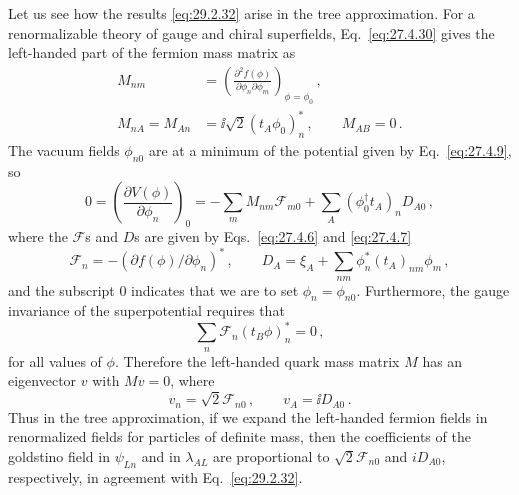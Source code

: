 Let us see how the results \eqref{eq:29.2.32} arise in the tree
approximation. For a renormalizable theory of gauge and chiral
superfields, Eq.~\eqref{eq:27.4.30} gives the left-handed part of the
fermion mass matrix as
\begin{equation}
  \begin{aligned}
  M_{nm}
  &=
  \left(
    \frac{\partial^2f(\phi)}
         {\partial\phi_n\partial\phi_m}
  \right)_{\phi=\phi_0}\,,
  \\
  M_{nA}=M_{An}
  &=\ii\sqrt{2}(t_A\phi_0)_n^*\,,
  \qquad
  M_{AB}=0\,.
  \end{aligned}
  \tag{29.2.33}\label{eq:29.2.33}
\end{equation}
The vacuum fields \(\phi_{n0}\) are at a minimum of the potential given
by Eq.~\eqref{eq:27.4.9}, so
\begin{equation}
  0
  =
  \left(\frac{\partial V(\phi)}{\partial\phi_n}\right)_0
  =
  -\sum_m M_{nm}\mathcal{F}_{m0}
  +\sum_A(\phi_0^\dagger t_A)_nD_{A0}\,,
  \tag{29.2.34}\label{eq:29.2.34}
\end{equation}
where the \(\mathcal{F}\)s and \(D\)s are given by
Eqs.~\eqref{eq:27.4.6} and \eqref{eq:27.4.7}
\[
  \mathcal{F}_n
  =-\left(\partial f(\phi)/\partial\phi_n\right)^*\,,
  \qquad
  D_A
  =\xi_A+\sum_{nm}\phi_n^*(t_A)_{nm}\phi_m\,,
\]
and the subscript 0 indicates that we are to set
\(\phi_n=\phi_{n0}\). Furthermore, the gauge invariance of the
superpotential requires that
\begin{equation}
  \sum_n\mathcal{F}_n(t_B\phi)_n^*=0\,,
  \tag{29.2.35}\label{eq:29.2.35}
\end{equation}
for all values of \(\phi\). Therefore the left-handed quark mass matrix
\(M\) has an eigenvector \(v\) with \(Mv=0\), where
\begin{equation}
  v_n=\sqrt{2}\mathcal{F}_{n0}\,,
  \qquad
  v_A=\ii D_{A0}\,.
  \tag{29.2.36}\label{eq:29.2.36}
\end{equation}
Thus in the tree approximation, if we expand the left-handed fermion
fields in renormalized fields for particles of definite mass, then the
coefficients of the goldstino field in \(\psi_{Ln}\) and in
\(\lambda_{AL}\) are proportional to \(\sqrt{2}\mathcal{F}_{n0}\) and
\(iD_{A0}\), respectively, in agreement with Eq.~\eqref{eq:29.2.32}.

